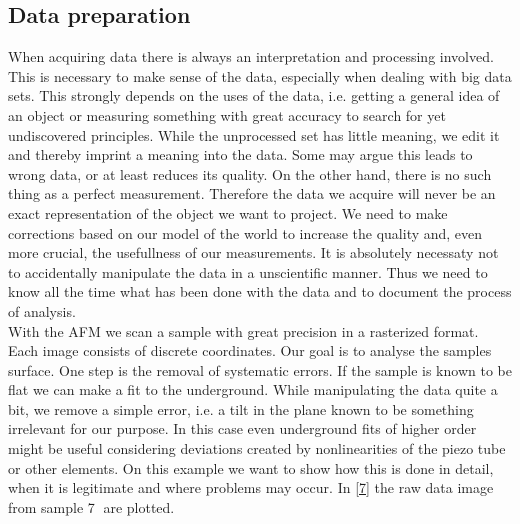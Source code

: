 \documentclass[paper=a4,fontsize=10pt,DIV=18,twocolumn,parskip=half]{scrartcl}
\numberwithin{equation}{section}    %
\begin{document}
\subsection{Data preparation}
When acquiring data there is always an interpretation and processing involved.  
This is necessary to make sense of the data, especially when dealing with big 
data sets. This strongly depends on the uses of the data, i.e. getting a general 
idea of an object or measuring something with great accuracy to search for yet 
undiscovered principles. While the unprocessed set has little meaning, we edit 
it and thereby imprint a meaning into the data. Some may argue this leads to 
wrong data, or at least reduces its quality. On the other hand, there is no such 
thing as a perfect measurement.  Therefore the data we acquire will never be an 
exact representation of the object we want to project. We need to make 
corrections based on our model of the world to increase the quality and, even 
more crucial, the usefullness of our measurements.  It is absolutely necessaty 
not to accidentally manipulate the data in a unscientific manner. Thus we need 
to know all the time what has been done with the data and to document the 
process of analysis. \\
With the AFM we scan a sample with great precision in a rasterized format. Each 
image consists of discrete coordinates. Our goal is to analyse the samples 
surface. One step is the removal of systematic errors. If the sample is known to 
be flat we can make a fit to the underground. While manipulating the data quite 
a bit, we remove a simple error, i.e. a tilt in the plane known to be something 
irrelevant for our purpose. In this case even underground fits of higher order 
might be useful considering deviations created by nonlinearities of the piezo 
tube or other elements. On this example we want to show how this is done in 
detail, when it is legitimate and where problems may occur. In \ref{7} the 
raw data image from sample \textcircled{7} are plotted.
\end{document}
